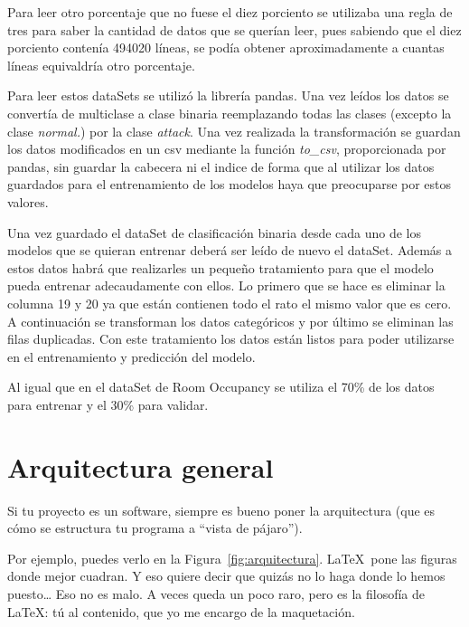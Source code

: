 \documentclass[a4paper, 12pt]{book}
\begin{document}
Para leer otro porcentaje que no fuese el diez porciento se utilizaba una regla de tres para saber la cantidad de datos que se querían leer, pues sabiendo que el diez porciento contenía 494020 líneas, se podía obtener aproximadamente a cuantas líneas equivaldría otro porcentaje.

Para leer estos dataSets se utilizó la librería pandas. Una vez leídos los datos se convertía de multiclase a clase binaria reemplazando todas las clases (excepto la clase \textit{normal.}) por la clase \textit{attack}. Una vez realizada la transformación se guardan los datos modificados en un csv mediante la función \textit{to\_csv}, proporcionada por pandas, sin guardar la cabecera ni el indice de forma que al utilizar los datos guardados para el entrenamiento de los modelos haya que preocuparse por estos valores.

Una vez guardado el dataSet de clasificación binaria desde cada uno de los modelos que se quieran entrenar deberá ser leído de nuevo el dataSet. Además a estos datos habrá que realizarles un pequeño tratamiento para que el modelo pueda entrenar adecaudamente con ellos. Lo primero que se hace es eliminar la columna 19 y 20 ya que están contienen todo el rato el mismo valor que es cero. A continuación se transforman los datos categóricos y por último se eliminan las filas duplicadas. Con este tratamiento los datos están listos para poder utilizarse en el entrenamiento y predicción del modelo.

Al igual que en el dataSet de Room Occupancy se utiliza el 70\% de los datos para entrenar y el 30\% para validar.

\section{Arquitectura general} 
\label{sec:arquitectura}

Si tu proyecto es un software, siempre es bueno poner la arquitectura (que es cómo se estructura tu programa a ``vista de pájaro'').

Por ejemplo, puedes verlo en la Figura~\ref{fig:arquitectura}.
\LaTeX \ pone las figuras donde mejor cuadran. 
Y eso quiere decir que quizás no lo haga donde lo hemos puesto\ldots
Eso no es malo.
A veces queda un poco raro, pero es la filosofía de \LaTeX: tú al contenido, que yo me encargo de la maquetación.
\end{document}
